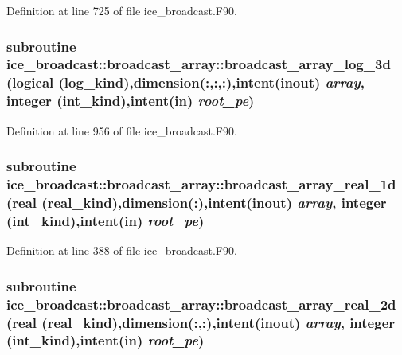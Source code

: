 Definition at line 725 of file ice\_\-broadcast.F90.\hypertarget{interfaceice__broadcast_1_1broadcast__array_a62bd5d81d1fb0408e414f7648d282b3a}{
\subsubsection[{broadcast\_\-array\_\-log\_\-3d}]{\setlength{\rightskip}{0pt plus 5cm}subroutine ice\_\-broadcast::broadcast\_\-array::broadcast\_\-array\_\-log\_\-3d (logical (log\_\-kind),dimension(:,:,:),intent(inout) {\em array}, \/  integer (int\_\-kind),intent(in) {\em root\_\-pe})}}
\label{interfaceice__broadcast_1_1broadcast__array_a62bd5d81d1fb0408e414f7648d282b3a}


Definition at line 956 of file ice\_\-broadcast.F90.\hypertarget{interfaceice__broadcast_1_1broadcast__array_a460bc5374d7e5fc6eb13c1766573c509}{
\subsubsection[{broadcast\_\-array\_\-real\_\-1d}]{\setlength{\rightskip}{0pt plus 5cm}subroutine ice\_\-broadcast::broadcast\_\-array::broadcast\_\-array\_\-real\_\-1d (real (real\_\-kind),dimension(:),intent(inout) {\em array}, \/  integer (int\_\-kind),intent(in) {\em root\_\-pe})}}
\label{interfaceice__broadcast_1_1broadcast__array_a460bc5374d7e5fc6eb13c1766573c509}


Definition at line 388 of file ice\_\-broadcast.F90.\hypertarget{interfaceice__broadcast_1_1broadcast__array_ab61709b9405642aa85b70bbe33dc3f9d}{
\subsubsection[{broadcast\_\-array\_\-real\_\-2d}]{\setlength{\rightskip}{0pt plus 5cm}subroutine ice\_\-broadcast::broadcast\_\-array::broadcast\_\-array\_\-real\_\-2d (real (real\_\-kind),dimension(:,:),intent(inout) {\em array}, \/  integer (int\_\-kind),intent(in) {\em root\_\-pe})}}
\label{interfaceice__broadcast_1_1broadcast__array_ab61709b9405642aa85b70bbe33dc3f9d}


